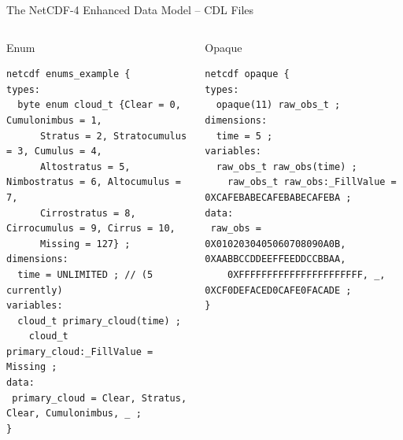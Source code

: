 \documentclass[compress,11pt,xcolor=svgnames,aspectratio=169]{beamer}
\begin{document}
\begin{frame}[fragile]{The NetCDF-4 Enhanced Data Model -- CDL Files}

\begin{columns}

\begin{column}{0.45\textwidth}
\begin{block}{Enum}
\vspace*{-0.4cm}
{ \tiny
\begin{verbatim}
netcdf enums_example {
types:
  byte enum cloud_t {Clear = 0, Cumulonimbus = 1,
      Stratus = 2, Stratocumulus = 3, Cumulus = 4,
      Altostratus = 5, Nimbostratus = 6, Altocumulus = 7,
      Cirrostratus = 8, Cirrocumulus = 9, Cirrus = 10,
      Missing = 127} ;
dimensions:
  time = UNLIMITED ; // (5 currently)
variables:
  cloud_t primary_cloud(time) ;
    cloud_t primary_cloud:_FillValue = Missing ;
data:
 primary_cloud = Clear, Stratus, Clear, Cumulonimbus, _ ;
}
\end{verbatim}
}
\vspace*{-0.4cm}
\end{block}
\end{column}

\begin{column}{0.5\textwidth}
\begin{block}{Opaque}
\vspace*{-0.4cm}
{ \tiny
\begin{verbatim}
netcdf opaque {
types:
  opaque(11) raw_obs_t ;
dimensions:
  time = 5 ;
variables:
  raw_obs_t raw_obs(time) ;
    raw_obs_t raw_obs:_FillValue = 0XCAFEBABECAFEBABECAFEBA ;
data:
 raw_obs = 0X0102030405060708090A0B, 0XAABBCCDDEEFFEEDDCCBBAA,
    0XFFFFFFFFFFFFFFFFFFFFFF, _, 0XCF0DEFACED0CAFE0FACADE ;
}
\end{verbatim}
}
\vspace*{-0.4cm}
\end{block}
\end{column}

\end{columns}

\end{frame}
\end{document}
